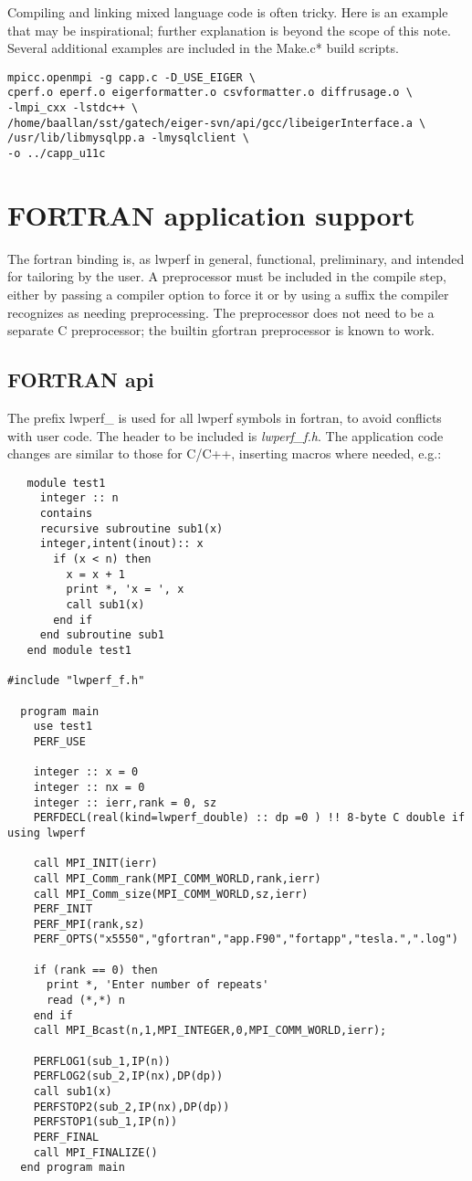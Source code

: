 \documentclass{article}
\begin{document}
Compiling and linking mixed language code is often tricky. Here is an example that may be inspirational; further explanation is beyond the scope of this note. Several additional examples are included in the Make.c* build scripts.
\begin{verbatim}
mpicc.openmpi -g capp.c -D_USE_EIGER \
cperf.o eperf.o eigerformatter.o csvformatter.o diffrusage.o \
-lmpi_cxx -lstdc++ \
/home/baallan/sst/gatech/eiger-svn/api/gcc/libeigerInterface.a \
/usr/lib/libmysqlpp.a -lmysqlclient \
-o ../capp_u11c
\end{verbatim}

\section{FORTRAN application support}
\label{sec:fortran}
The fortran binding is, as lwperf in general, functional, preliminary, and intended for tailoring by the user.  A preprocessor must be included in the compile step, either by passing a compiler option to force it or by using a suffix the compiler recognizes as needing preprocessing. The preprocessor does not need to be a separate C preprocessor; the builtin gfortran preprocessor is known to work.

\subsection{FORTRAN api}
\label{sec:fapi}
The prefix lwperf\_ is used for all lwperf symbols in fortran, to avoid conflicts with user code. The header to be included is {\em lwperf\_f.h}. 
The application code changes are similar to those for C/C++, inserting macros where needed, e.g.:
\begin{verbatim}
   module test1
     integer :: n
     contains
     recursive subroutine sub1(x)
     integer,intent(inout):: x
       if (x < n) then
         x = x + 1
         print *, 'x = ', x
         call sub1(x)
       end if
     end subroutine sub1
   end module test1

#include "lwperf_f.h"

  program main
    use test1
    PERF_USE

    integer :: x = 0
    integer :: nx = 0
    integer :: ierr,rank = 0, sz
    PERFDECL(real(kind=lwperf_double) :: dp =0 ) !! 8-byte C double if using lwperf

    call MPI_INIT(ierr)
    call MPI_Comm_rank(MPI_COMM_WORLD,rank,ierr)
    call MPI_Comm_size(MPI_COMM_WORLD,sz,ierr)
    PERF_INIT
    PERF_MPI(rank,sz)
    PERF_OPTS("x5550","gfortran","app.F90","fortapp","tesla.",".log") 

    if (rank == 0) then
      print *, 'Enter number of repeats'
      read (*,*) n
    end if
    call MPI_Bcast(n,1,MPI_INTEGER,0,MPI_COMM_WORLD,ierr);

    PERFLOG1(sub_1,IP(n)) 
    PERFLOG2(sub_2,IP(nx),DP(dp))
    call sub1(x)
    PERFSTOP2(sub_2,IP(nx),DP(dp))
    PERFSTOP1(sub_1,IP(n))
    PERF_FINAL
    call MPI_FINALIZE()
  end program main
\end{verbatim}
\end{document}
